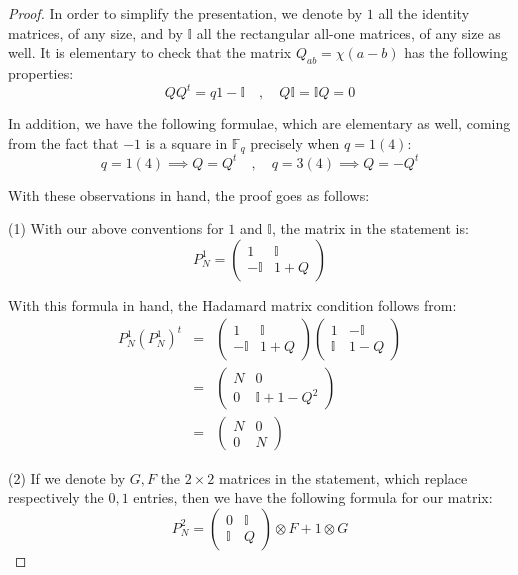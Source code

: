\documentclass[12pt]{amsbook}
\begin{document}
\begin{proof}
In order to simplify the presentation, we denote by $1$ all the identity matrices, of any size, and by $\mathbb I$ all the rectangular all-one matrices, of any size as well. It is elementary to check that the matrix $Q_{ab}=\chi(a-b)$ has the following properties:
$$QQ^t=q1-\mathbb I\quad,\quad 
Q\mathbb I=\mathbb IQ=0$$

In addition, we have the following formulae, which are elementary as well, coming from the fact that $-1$ is a square in $\mathbb F_q$ precisely when $q=1(4)$:
$$q=1(4)\implies Q=Q^t\quad,\quad
q=3(4)\implies Q=-Q^t$$

With these observations in hand, the proof goes as follows:

\medskip

(1) With our above conventions for $1$ and $\mathbb I$, the matrix in the statement is:
$$P_N^1=\begin{pmatrix}1&\mathbb I\\ -\mathbb I&1+Q\end{pmatrix}$$
 
With this formula in hand, the Hadamard matrix condition follows from:
\begin{eqnarray*}
P_N^1(P_N^1)^t
&=&\begin{pmatrix}1&\mathbb I\\ -\mathbb I&1+Q\end{pmatrix}\begin{pmatrix}1&-\mathbb I\\ \mathbb I&1-Q\end{pmatrix}\\
&=&\begin{pmatrix}N&0\\ 0&\mathbb I+1-Q^2\end{pmatrix}\\
&=&\begin{pmatrix}N&0\\ 0&N\end{pmatrix}
\end{eqnarray*}

(2) If we denote by $G,F$ the $2\times2$ matrices in the statement, which replace respectively the $0,1$ entries, then we have the following formula for our matrix:
$$P_N^2=\begin{pmatrix}0&\mathbb I\\ \mathbb I&Q\end{pmatrix}\otimes F+1\otimes G$$


\end{proof}
\end{document}
